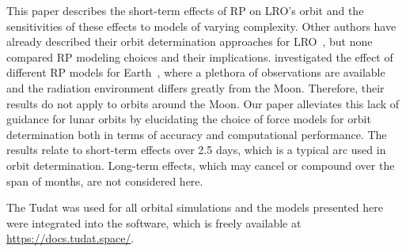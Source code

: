 This paper describes the short-term effects of \gls{RP} on \gls{LRO}'s orbit and the sensitivities of these effects to models of varying complexity. Other authors have already described their orbit determination approaches for \gls{LRO}~\cite{Mazarico2011,Mazarico2018,Nicholson2010,Smith2008,Slojkowski2014,Slojkowski2015,Bauer2016,Maier2016}, but none compared \gls{RP} modeling choices and their implications. \citeauthor{Vielberg2020} investigated the effect of different \gls{RP} models for Earth~\cite{Vielberg2020}, where a plethora of observations are available and the radiation environment differs greatly from the Moon. Therefore, their results do not apply to orbits around the Moon. Our paper alleviates this lack of guidance for lunar orbits by elucidating the choice of force models for orbit determination both in terms of accuracy and computational performance. The results relate to short-term effects over 2.5 days, which is a typical arc used in orbit determination. Long-term effects, which may cancel or compound over the span of months, are not considered here.

The \gls{Tudat} was used for all orbital simulations and the models presented here were integrated into the software, which is freely available at \url{https://docs.tudat.space/}.

{\let\thefootnote\relax{}}
